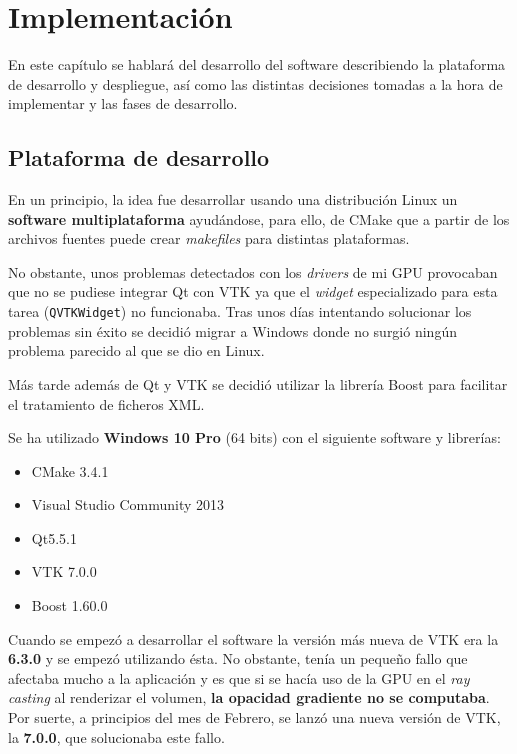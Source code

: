 \chapter{Implementación}

En este capítulo se hablará del desarrollo del software describiendo la plataforma de desarrollo y despliegue, así como las distintas decisiones tomadas a la hora de implementar y las fases de desarrollo.

\section{Plataforma de desarrollo}

En un principio, la idea fue desarrollar usando una distribución Linux un \textbf{software multiplataforma} ayudándose, para ello, de CMake \cite{cmake} que a partir de los archivos fuentes puede crear \textit{makefiles} para distintas plataformas.

No obstante, unos problemas detectados con los \textit{drivers} de mi GPU provocaban que no se pudiese integrar Qt \cite{qt} con VTK \cite{vtk} ya que el \textit{widget} especializado para esta tarea (\texttt{QVTKWidget}) no funcionaba. Tras unos días intentando solucionar los problemas sin éxito se decidió migrar a Windows donde no surgió ningún problema parecido al que se dio en Linux.

Más tarde además de Qt y VTK se decidió utilizar la librería Boost \cite{boost} para facilitar el tratamiento de ficheros XML.

Se ha utilizado \textbf{Windows 10 Pro} (64 bits) con el siguiente software y librerías:

\begin{itemize}
	\item CMake 3.4.1
	\item Visual Studio Community 2013
	\item Qt5.5.1
	\item VTK 7.0.0
	\item Boost 1.60.0
\end{itemize}

Cuando se empezó a desarrollar el software la versión más nueva de VTK era la \textbf{6.3.0} y se empezó utilizando ésta. No obstante, tenía un pequeño fallo que afectaba mucho a la aplicación y es que si se hacía uso de la GPU en el \textit{ray casting} al renderizar el volumen, \textbf{la opacidad gradiente no se computaba}. Por suerte, a principios del mes de Febrero, se lanzó una nueva versión de VTK, la \textbf{7.0.0}, que solucionaba este fallo.

